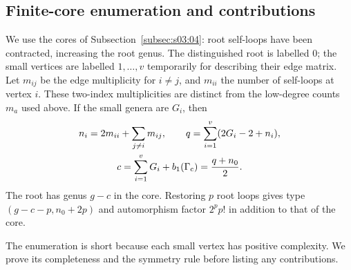 \subsection{Finite-core enumeration and contributions}
\label{subsec:a:04}

We use the cores of Subsection~\ref{subsec:s03:04}: root self-loops
have been contracted, increasing the root genus. The distinguished
root is labelled $0$; the small vertices are labelled $1,\ldots,v$
temporarily for describing their edge matrix. Let $m_{ij}$ be the edge
multiplicity for $i\ne j$, and $m_{ii}$ the number of self-loops at
vertex $i$. These two-index multiplicities are distinct from the
low-degree counts $m_a$ used above. If the small genera are $G_i$,
then
\begin{equation}\label{eq:a:core-data}
\begin{gathered}
 n_i=2m_{ii}+\sum_{j\ne i}m_{ij},\qquad
 q=\sum_{i=1}^v(2G_i-2+n_i),\\
 c=\sum_{i=1}^vG_i+b_1(\Gamma_{\rm c})=\frac{q+n_0}{2}.
\end{gathered}
\end{equation}
The root has genus $g-c$ in the core. Restoring $p$ root loops gives
type $(g-c-p,n_0+2p)$ and automorphism factor $2^pp!$ in addition
to that of the core.

The enumeration is short because each small vertex has positive
complexity. We prove its completeness and the symmetry rule before
listing any contributions.

